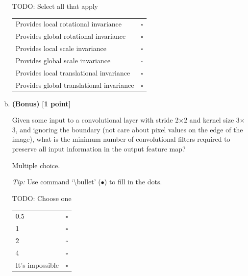 \begin{enumerate}[(a)]
\begin{tcolorbox}[colback=white!5!white,colframe=green!75!black]
TODO: Select all that apply %

\begin{tabular}[h]{lr}
\toprule
Provides local rotational invariance & $\square$ \\
Provides global rotational invariance & $\square$ \\
Provides local scale invariance & $\square$ \\
Provides global scale invariance & $\square$ \\
Provides local translational invariance & $\square$ \\
Provides global translational invariance & $\square$ \\
\bottomrule
\end{tabular}
\end{tcolorbox}


\item
\textbf{(Bonus)} \textbf{[1 point]}
\begin{tcolorbox}[colback=blue!5!white,colframe=blue!75!black]
Given some input to a convolutional layer with stride 2$\times$2 and kernel size 3$\times$3, and ignoring the boundary (not care about pixel values on the edge of the image), what is the minimum number of convolutional filters required to preserve all input information in the output feature map?
\end{tcolorbox}

Multiple choice.

\emph{Tip:} Use command  `\textbackslash bullet' ($\bullet$) to fill in the dots.

\begin{tcolorbox}[colback=white!5!white,colframe=green!75!black]
TODO: Choose one %

\begin{tabular}[h]{lc}
\toprule
0.5 & $\square$ \\
1 & $\square$ \\
2 & $\square$ \\
4 & $\square$ \\
It's impossible & $\square$ \\
\bottomrule
\end{tabular}
\end{tcolorbox}
\end{enumerate}


